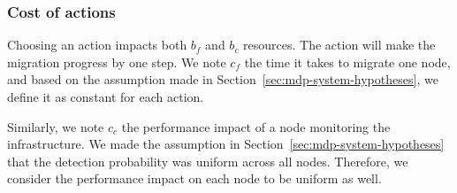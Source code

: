 
\subsubsection{Cost of actions}
Choosing an action impacts both $b_f$ and $b_c$ resources. The action will make the migration progress by one step.
We note $c_f$ the time it takes to migrate one node, and based on the assumption made in Section~\ref{sec:mdp-system-hypotheses}, we define it as constant for each action.

Similarly, we note $c_c$ the performance impact of a node monitoring the infrastructure. We made the assumption in Section~\ref{sec:mdp-system-hypotheses} that the detection probability was uniform across all nodes. Therefore, we consider the performance impact on each node to be uniform as well.





